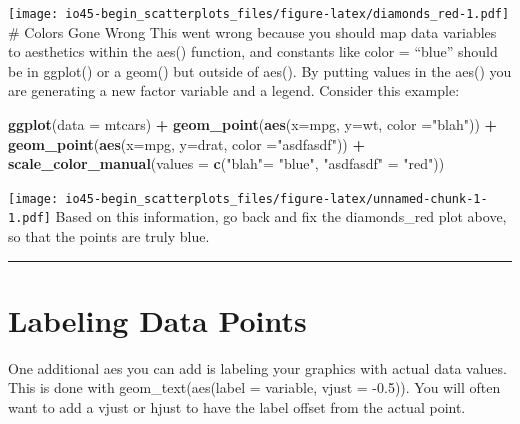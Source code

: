 \documentclass[
]{book}
\newenvironment{Shaded}{\begin{snugshade}}{\end{snugshade}}
\newcommand{\DataTypeTok}[1]{\textcolor[rgb]{0.13,0.29,0.53}{#1}}
\newcommand{\FloatTok}[1]{\textcolor[rgb]{0.00,0.00,0.81}{#1}}
\newcommand{\KeywordTok}[1]{\textcolor[rgb]{0.13,0.29,0.53}{\textbf{#1}}}
\newcommand{\NormalTok}[1]{#1}
\newcommand{\OperatorTok}[1]{\textcolor[rgb]{0.81,0.36,0.00}{\textbf{#1}}}
\newcommand{\StringTok}[1]{\textcolor[rgb]{0.31,0.60,0.02}{#1}}
\begin{document}
\texttt{[image: io45-begin\_scatterplots\_files/figure-latex/diamonds\_red-1.pdf]}
\# Colors Gone Wrong
This went wrong because you should map data variables to aesthetics within the aes() function, and constants like color = ``blue'' should be in ggplot() or a geom() but outside of aes().
By putting values in the aes() you are generating a new factor variable and a legend.
Consider this example:

\begin{Shaded}
\begin{Highlighting}[]
\KeywordTok{ggplot}\NormalTok{(}\DataTypeTok{data =}\NormalTok{ mtcars) }\OperatorTok{+}
\StringTok{  }\KeywordTok{geom_point}\NormalTok{(}\KeywordTok{aes}\NormalTok{(}\DataTypeTok{x=}\NormalTok{mpg, }\DataTypeTok{y=}\NormalTok{wt, }\DataTypeTok{color =}\StringTok{"blah"}\NormalTok{)) }\OperatorTok{+}
\StringTok{  }\KeywordTok{geom_point}\NormalTok{(}\KeywordTok{aes}\NormalTok{(}\DataTypeTok{x=}\NormalTok{mpg, }\DataTypeTok{y=}\NormalTok{drat, }\DataTypeTok{color =}\StringTok{"asdfasdf"}\NormalTok{)) }\OperatorTok{+}
\StringTok{  }\KeywordTok{scale_color_manual}\NormalTok{(}\DataTypeTok{values =} \KeywordTok{c}\NormalTok{(}\StringTok{"blah"}\NormalTok{=}\StringTok{ "blue"}\NormalTok{, }\StringTok{"asdfasdf"}\NormalTok{ =}\StringTok{ "red"}\NormalTok{))}
\end{Highlighting}
\end{Shaded}

\texttt{[image: io45-begin\_scatterplots\_files/figure-latex/unnamed-chunk-1-1.pdf]}
Based on this information, go back and fix the diamonds\_red plot above, so that the points are truly blue.

\begin{center}\rule{0.5\linewidth}{0.5pt}\end{center}

\hypertarget{labeling-data-points}{%
\chapter{Labeling Data Points}\label{labeling-data-points}}

One additional aes you can add is labeling your graphics with actual data values.
This is done with geom\_text(aes(label = variable, vjust = -0.5)).
You will often want to add a vjust or hjust to have the label offset from the actual point.

\begin{Shaded}
\end{Shaded}
\end{document}
